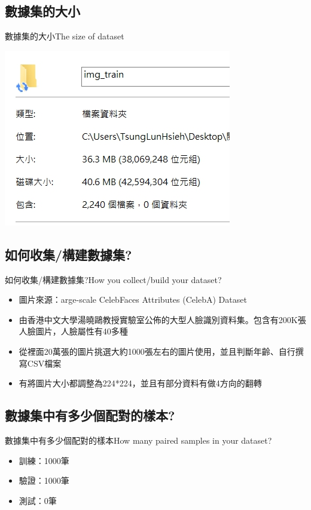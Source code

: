 \documentclass[utf8x]{beamer}
\begin{document}
\subsection{數據集的大小}
\begin{frame}{數據集的大小}{The size of  dataset}
\begin{minipage}[c][0.4\textheight][c]{\linewidth}
                \centering
                \includegraphics[width=0.5\linewidth]{1561052804594.jpg}
            \end{minipage}
\end{frame}
\subsection{如何收集/構建數據集?}
\begin{frame}{如何收集/構建數據集?}{How you collect/build your dataset?}
  \begin{itemize}
  \item {
    圖片來源：arge-scale CelebFaces Attributes (CelebA) Dataset
  }
  \item {
    由香港中文大學湯曉鷗教授實驗室公佈的大型人臉識別資料集。包含有200K張人臉圖片，人臉屬性有40多種
  }
 \item {
    從裡面20萬張的圖片挑選大約1000張左右的圖片使用，並且判斷年齡、自行撰寫CSV檔案
  }
 \item {
    有將圖片大小都調整為224*224，並且有部分資料有做4方向的翻轉
  }
  \end{itemize}
\end{frame}
\subsection{數據集中有多少個配對的樣本?}
\begin{frame}{數據集中有多少個配對的樣本}{How many paired samples in your dataset?}
  \begin{itemize}
  \item {
    訓練：1000筆
  }
  \item {
    驗證：1000筆
  }
 \item {
    測試：0筆
  }
  \end{itemize}
\end{frame}
\end{document}
